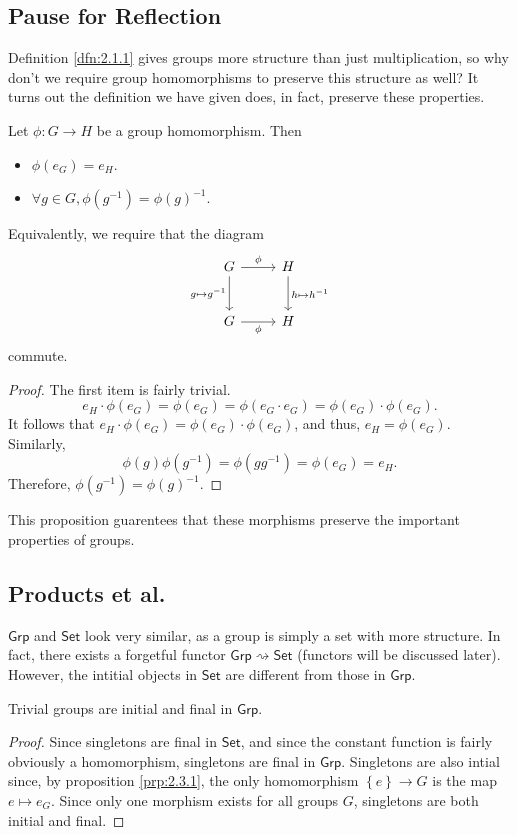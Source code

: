 \subsection{Pause for Reflection}
Definition \ref{dfn:2.1.1} gives groups more structure than just multiplication, so why don't we require group homomorphisms to preserve this structure as well? It turns out the definition we have given does, in fact, preserve these properties.
\begin{proposition}\label{prp:2.3.1}
	Let $\phi : G \to H$ be a group homomorphism. Then
	\begin{itemize}
		\item $\phi (e_G)=e_H$.
		\item $\forall g\in G, \phi \left( g^{-1} \right) =\phi (g)^{-1}$.
	\end{itemize}
	Equivalently, we require that the diagram
	\[\begin{tikzcd}[row sep=2.5em, column sep=2.5em]
		G\arrow[r, "\phi "]\arrow[d,"g\mapsto g^{-1}"']&H\arrow[d,"h\mapsto h^{-1}"]\\
		G\arrow[r,"\phi "']&H
	\end{tikzcd}\]
	commute.
\end{proposition}
\begin{proof}
	The first item is fairly trivial.
	\[
		e_H\cdot \phi (e_G)=\phi (e_G)=\phi (e_G\cdot e_G)=\phi (e_G)\cdot \phi (e_G)
	.\]
	It follows that $e_H\cdot \phi (e_G)=\phi (e_G)\cdot \phi (e_G)$, and thus, $e_H=\phi (e_G)$. Similarly,
	\[
		\phi (g)\phi \left( g^{-1} \right) =\phi \left( gg^{-1} \right) =\phi (e_G)=e_H
	.\]
	Therefore, $\phi (g^{-1})=\phi (g)^{-1}$.
\end{proof}

This proposition guarentees that these morphisms preserve the important properties of groups.
\subsection{Products et al.}
$\mathsf{Grp}$ and $\mathsf{Set}$ look very similar, as a group is simply a set with more structure. In fact, there exists a forgetful functor $\mathsf{Grp}\rightsquigarrow \mathsf{Set}$ (functors will be discussed later). However, the intitial objects in $\mathsf{Set}$ are different from those in $\mathsf{Grp}$.
\begin{proposition}\label{prp:2.3.2}
	Trivial groups are initial and final in $\mathsf{Grp}$.
\end{proposition}
\begin{proof}
	Since singletons are final in $\mathsf{Set}$, and since the constant function is fairly obviously a homomorphism, singletons are final in $\mathsf{Grp}$. Singletons are also intial since, by proposition \ref{prp:2.3.1}, the only homomorphism $\left\{ e \right\} \to G$ is the map $e\mapsto e_G$. Since only one morphism exists for all groups $G$, singletons are both initial and final.
\end{proof}

